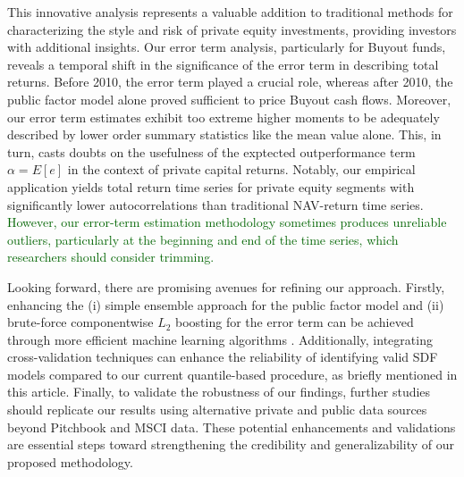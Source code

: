 \documentclass[12pt]{article}
\begin{document}
This innovative analysis represents a valuable addition to traditional methods for characterizing the style and risk of private equity investments, providing investors with additional insights. 
Our error term analysis, particularly for Buyout funds, reveals a temporal shift in the significance of the error term in describing total returns. 
Before 2010, the error term played a crucial role, whereas after 2010, the public factor model alone proved sufficient to price Buyout cash flows. 
Moreover, our error term estimates exhibit too extreme higher moments to be adequately  described by lower order summary statistics like the mean value alone.
This, in turn, casts doubts on the usefulness of the exptected outperformance term $\alpha = E [ e ]$ in the context of private capital returns.
Notably, our empirical application yields total return time series for private equity segments with significantly lower autocorrelations than traditional NAV-return time series.
\textcolor{darkgreen}{
However, our error-term estimation methodology sometimes produces unreliable outliers, particularly at the beginning and end of the time series, which researchers should consider trimming.
}

Looking forward, there are promising avenues for refining our approach. 
Firstly, enhancing the (i) simple ensemble approach for the public factor model and (ii) brute-force componentwise $L_2$ boosting for the error term can be achieved through more efficient machine learning algorithms \citep{B12}.
Additionally, integrating cross-validation techniques can enhance the reliability of identifying valid SDF models compared to our current quantile-based procedure, as briefly mentioned in this article.
Finally, to validate the robustness of our findings, further studies should replicate our results using alternative private and public data sources beyond Pitchbook and MSCI data. 
These potential enhancements and validations are essential steps toward strengthening the credibility and generalizability of our proposed methodology.




\appendix


% 

% 
\end{document}
